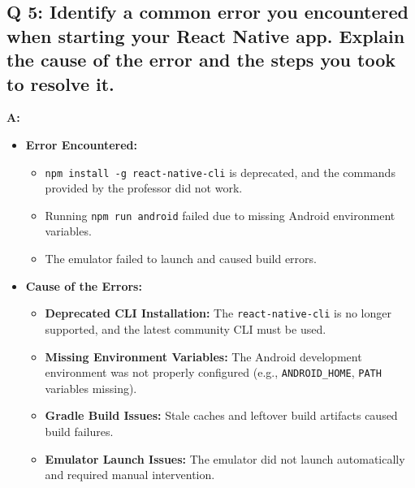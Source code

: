 \documentclass{article}
\begin{document}
\subsection*{Q 5: Identify a common error you encountered when starting your React Native app. Explain the cause of the error and the steps you took to resolve it.}
\textbf{A:}
\begin{itemize}
    \item \textbf{Error Encountered:}
    \begin{itemize}
        \item \texttt{npm install -g react-native-cli} is deprecated, and the commands provided by the professor did not work.
        \item Running \texttt{npm run android} failed due to missing Android environment variables.
        \item The emulator failed to launch and caused build errors.
    \end{itemize}

    \item \textbf{Cause of the Errors:}
    \begin{itemize}
        \item \textbf{Deprecated CLI Installation:} The \texttt{react-native-cli} is no longer supported, and the latest community CLI must be used.
        \item \textbf{Missing Environment Variables:} The Android development environment was not properly configured (e.g., \texttt{ANDROID\_HOME}, \texttt{PATH} variables missing).
        \item \textbf{Gradle Build Issues:} Stale caches and leftover build artifacts caused build failures.
        \item \textbf{Emulator Launch Issues:} The emulator did not launch automatically and required manual intervention.
    \end{itemize}


\end{itemize}
\end{document}
